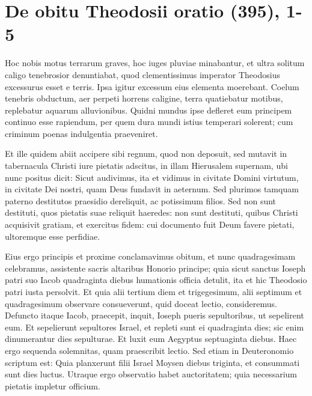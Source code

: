 
\section*{De obitu Theodosii oratio (395), 1-5}

Hoc nobis motus terrarum graves, hoc iuges pluviae minabantur, et ultra solitum caligo tenebrosior denuntiabat, quod clementissimus imperator Theodosius excessurus esset e terris. Ipsa igitur excessum eius elementa moerebant. Coelum tenebris obductum, aer perpeti horrens caligine, terra quatiebatur motibus, replebatur aquarum alluvionibus. Quidni mundus ipse defleret eum principem continuo esse rapiendum, per quem dura mundi istius temperari solerent; cum criminum poenas indulgentia praeveniret.

Et ille quidem abiit accipere sibi regnum, quod non deposuit, sed mutavit in tabernacula Christi iure pietatis adscitus, in illam Hierusalem supernam, ubi nunc positus dicit: Sicut audivimus, ita et vidimus in civitate Domini virtutum, in civitate Dei nostri, quam Deus fundavit in aeternum. Sed plurimos tamquam paterno destitutos praesidio dereliquit, ac potissimum filios. Sed non sunt destituti, quos pietatis suae reliquit haeredes: non sunt destituti, quibus Christi acquisivit gratiam, et exercitus fidem: cui documento fuit Deum favere pietati, ultoremque esse perfidiae.

Eius ergo principis et proxime conclamavimus obitum, et nunc quadragesimam celebramus, assistente sacris altaribus Honorio principe; quia sicut sanctus Ioseph patri suo Iacob quadraginta diebus humationis officia detulit, ita et hic Theodosio patri iusta persolvit. Et quia alii tertium diem et trigegesimum, alii septimum et quadragesimum observare consueverunt, quid doceat lectio, consideremus. Defuncto itaque Iacob, praecepit, inquit, Ioseph pueris sepultoribus, ut sepelirent eum. Et sepelierunt sepultores Israel, et repleti sunt ei quadraginta dies; sic enim dinumerantur dies sepulturae. Et luxit eum Aegyptus septuaginta diebus. Haec ergo sequenda solemnitas, quam praescribit lectio. Sed etiam in Deuteronomio scriptum est: Quia planxerunt filii Israel Moysen diebus triginta, et consummati sunt dies luctus. Utraque ergo observatio habet auctoritatem; quia necessarium pietatis impletur officium.

